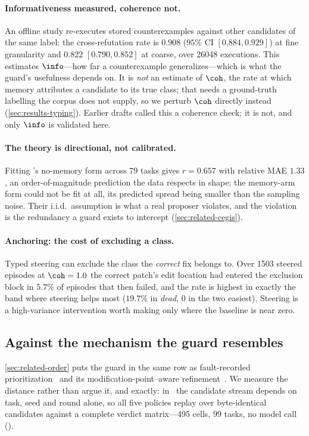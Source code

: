 \paragraph{Informativeness measured, coherence not.}
An offline study re-executes stored counterexamples against other candidates of
the same label: the cross-refutation rate is $0.908$ ($95\%$ CI
$[0.884, 0.929]$) at fine granularity and $0.822$ $[0.790, 0.852]$ at coarse,
over \num{26048} executions. This estimates $\info$---how far a counterexample
generalizes---which is what the guard's usefulness depends on. It is \emph{not}
an estimate of $\coh$, the rate at which memory attributes a candidate to its
true class; that needs a ground-truth labelling the corpus does not supply, so
we perturb $\coh$ directly instead (\cref{sec:results-typing}). Earlier drafts
called this a coherence check; it is not, and only $\info$ is validated here.

\paragraph{The theory is directional, not calibrated.}
Fitting \Rredund's no-memory form across $79$ tasks gives $r = 0.657$ with
relative MAE $1.33$, an order-of-magnitude prediction the data respects in
shape; the memory-arm form could not be fit at all, its predicted spread being
smaller than the sampling noise. Their
i.i.d.\ assumption is what a real proposer violates, and the violation is the
redundancy a guard exists to intercept (\cref{sec:related-cegis}).

\paragraph{Anchoring: the cost of excluding a class.}
Typed steering can exclude the class the \emph{correct} fix belongs to. Over
\num{1503} steered episodes at $\coh = 1.0$ the correct patch's edit location
had entered the exclusion block in $5.7\%$ of episodes that then failed, and
the rate is highest in exactly the band where steering helps most ($19.7\%$ in
\emph{dead}, $0$ in the two easiest). Steering is a high-variance intervention
worth making only where the baseline is near zero.

\subsection{Against the mechanism the guard resembles}
\label{sec:results-policies}

\cref{sec:related-order} puts the guard in the same row as fault-recorded
prioritization~\cite{qi2013efficient} and its modification-point--aware
refinement~\cite{venugopal2020modification}. We measure the distance rather
than argue it, and exactly: in \armnomem\ the candidate stream depends on task,
seed and round alone, so all five policies replay over byte-identical
candidates against a complete verdict matrix---\num{495} cells, $99$ tasks, no
model call ().

